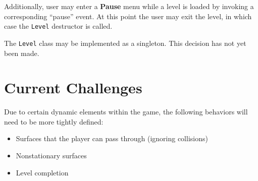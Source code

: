 \documentclass{article}
\begin{document}
Additionally, user may enter a \textbf{Pause} menu while a level is loaded by invoking a corresponding ``pause'' event.
At this point the user may exit the level, in which case the \texttt{Level} destructor is called.

The \texttt{Level} class may be implemented as a singleton. This decision has not yet been made.

\section{Current Challenges}
Due to certain dynamic elements within the game, the following behaviors will need to be more tightly defined:
\begin{itemize}
    \item Surfaces that the player can pass through (ignoring collisions)
    \item Nonstationary surfaces
    \item Level completion
\end{itemize}

\end{document}
